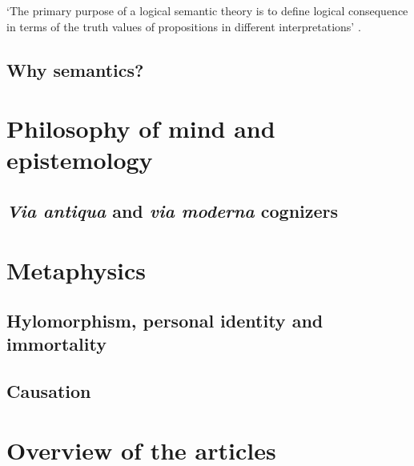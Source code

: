 \documentclass[]{article}
\begin{document}
`The primary purpose of a logical semantic theory is to define logical consequence in terms of the truth values of propositions in different interpretations' \autocite[79]{Klima1991b}. 

\subsection{Why semantics?}
\section{Philosophy of mind and epistemology}
\subsection{\textit{Via antiqua} and \textit{via moderna} cognizers}
\section{Metaphysics}
\subsection{Hylomorphism, personal identity and immortality}
\subsection{Causation}
\section{Overview of the articles}

\printbibliography
\end{document}
